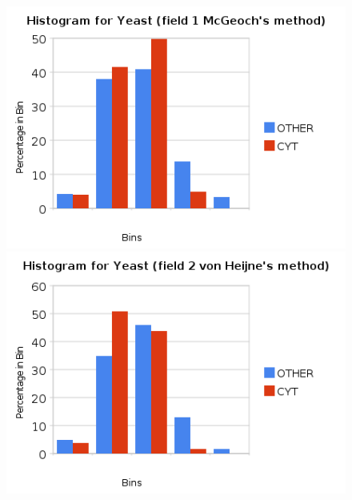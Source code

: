 \documentclass[a4paper,10pt]{article}
\begin{document}
        \begin{figure}[ht!]
          \begin{minipage}[b]{0.5\linewidth}
            \includegraphics[scale=0.45]{charts/YeastPics/Y1.png}
          \end{minipage}
          \begin{minipage}[b]{0.5\linewidth}
             \includegraphics[scale=0.45]{charts/YeastPics/Y2.png}
          \end{minipage} 
        \end{figure}
\end{document}

